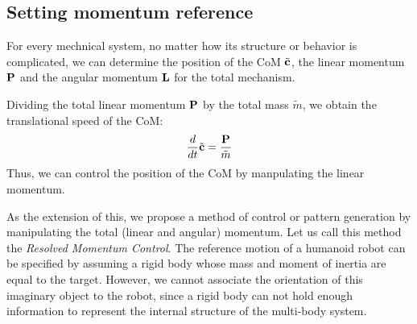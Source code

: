 \subsection{Setting momentum reference}

For every mechnical system, no matter how its structure or behavior is complicated,
we can determine the position of the CoM $\tilde{\bf c}$,
the linear momentum ${\bf P}$ and the angular momentum ${\bf L}$
for the total mechanism.
\par
Dividing the total linear momentum ${\bf P}$  by the total mass $\tilde{m}$,
we obtain the translational speed of the CoM:
\begin{equation}
\frac{d}{dt}\tilde{\bf c} = \frac{\bf P}{\tilde{m}}
\end{equation}
Thus, we can control the position of the CoM by manpulating the linear momentum.
\par
As the extension of this, we propose a method of control or pattern generation
by manipulating the total (linear and angular) momentum. Let us call this
method the \textit{Resolved Momentum Control}. The reference motion of a humanoid robot
 can be specified by assuming a rigid body whose mass and moment of inertia
are equal to the target. However, we cannot associate the orientation of this 
imaginary object to the robot, since a rigid body can not hold enough information
to represent the internal structure of the multi-body system.

